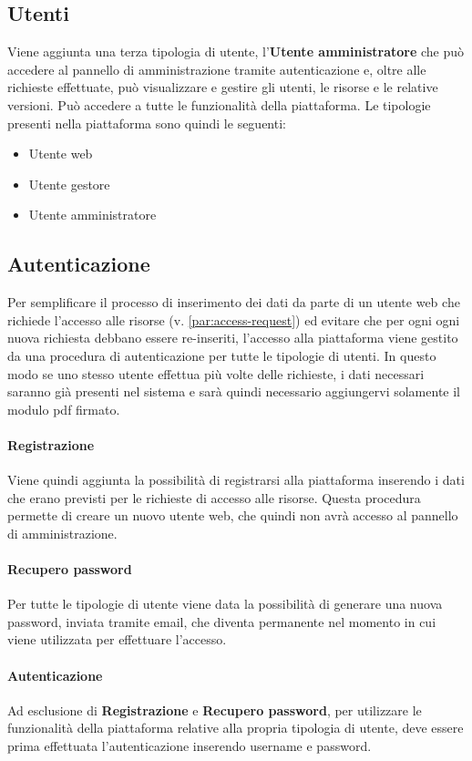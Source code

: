 \subsection{Utenti}
Viene aggiunta una terza tipologia di utente, l'\textbf{Utente amministratore}
che può accedere al pannello di amministrazione tramite autenticazione e, oltre
alle richieste effettuate, può visualizzare e gestire gli utenti, le risorse e
le relative versioni. Può accedere a tutte le funzionalità della piattaforma.
Le tipologie presenti nella piattaforma sono quindi le seguenti:
\begin{itemize}
	\item Utente web
	\item Utente gestore
	\item Utente amministratore
\end{itemize}


\subsection{Autenticazione}
Per semplificare il processo di inserimento dei dati da parte di un utente web
che richiede l'accesso alle risorse (v. \ref{par:access-request}) ed evitare che
per ogni ogni nuova richiesta debbano essere re-inseriti, l'accesso alla piattaforma
viene gestito da una procedura di autenticazione per tutte le tipologie di utenti.
In questo modo se uno stesso utente effettua più volte delle richieste, i dati
necessari saranno già presenti nel sistema e sarà quindi necessario aggiungervi
solamente il modulo pdf firmato.

\paragraph{Registrazione}
Viene quindi aggiunta la possibilità di registrarsi alla piattaforma inserendo i
dati che erano previsti per le richieste di accesso alle risorse. Questa procedura
permette di creare un nuovo utente web, che quindi non avrà accesso al pannello
di amministrazione.

\paragraph{Recupero password}
Per tutte le tipologie di utente viene data la possibilità di generare una nuova
password, inviata tramite email, che diventa permanente nel momento in cui
viene utilizzata per effettuare l'accesso.

\paragraph{Autenticazione}
Ad esclusione di \textbf{Registrazione} e \textbf{Recupero password}, per utilizzare
le funzionalità della piattaforma relative alla propria tipologia di utente,
deve essere prima effettuata l'autenticazione inserendo username e password.


